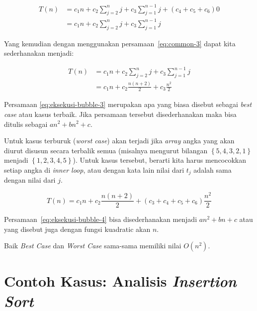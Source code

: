\begin{equation}\label{eq:eksekusi-bubble-2}
    \begin{aligned}
        T(n) & = c_{1}n + c_{2}\sum\limits_{j=2}^n j + c_{3}\sum\limits_{j=1}^{n-1} j + (c_{4}+c_{5}+c_{6}) 0 \\
             & =  c_{1}n + c_{2}\sum\limits_{j=2}^n j + c_{3}\sum\limits_{j=1}^{n-1} j
    \end{aligned}
\end{equation}

Yang kemudian dengan menggunakan persamaan~\ref{eq:common-3} dapat kita sederhanakan menjadi:

\begin{equation}\label{eq:eksekusi-bubble-3}
    \begin{aligned}
        T(n) & =  c_{1}n + c_{2}\sum\limits_{j=2}^n j + c_{3}\sum\limits_{j=1}^{n-1} j \\
             & = c_{1}n + c_2 \frac{n(n+2)}{2} + c_3 \frac{n^2}{2} 
    \end{aligned}
\end{equation}

Persamaan \ref{eq:eksekusi-bubble-3} merupakan apa yang biasa disebut sebagai \textit{best case} atau kasus terbaik. Jika persamaan tersebut disederhanakan maka bisa ditulis sebagai $an^2+bn^2+c$. 

Untuk kasus terburuk (\textit{worst case}) akan terjadi jika \textit{array} angka yang akan diurut disusun secara terbalik semua (misalnya mengurut bilangan $\left\{5,4,3,2,1\right\}$ menjadi $\left\{1,2,3,4,5\right\}$). Untuk kasus tersebut, berarti kita harus mencocokkan setiap angka di \textit{inner loop}, atau dengan kata lain nilai dari $t_{j}$ adalah sama dengan nilai dari $j$. 

\begin{equation}\label{eq:eksekusi-bubble-4}
    T(n) = c_{1}n + c_2\frac{n(n+2)}{2} + (c_3+c_4+c_5+c_6)\frac{n^2}{2}
\end{equation}

Persamaan~\ref{eq:eksekusi-bubble-4} bisa disederhanakan menjadi $an^2+bn+c$ atau yang disebut juga dengan fungsi kuadratic akan $n$. 

Baik \textit{Best Case} dan \textit{Worst Case} sama-sama memiliki nilai $O(n^2)$.

\section{Contoh Kasus: Analisis \textit{Insertion Sort}}

